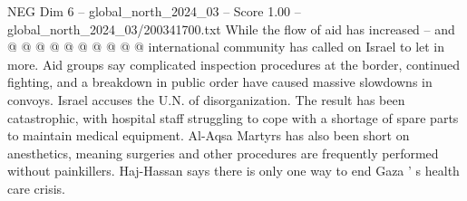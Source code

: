 \begin{textsample}{NEG Dim 6 – global\_north\_2024\_03 – Score 1.00 – global\_north\_2024\_03/200341700.txt}
While the flow of aid has increased -- and @ @ @ @ @ @ @ @ @ @ international community has called on Israel to let in more.
Aid groups say complicated inspection procedures at the border, continued fighting, and a breakdown in public order have caused massive slowdowns in convoys.
Israel accuses the U.N. of disorganization.
The result has been catastrophic, with hospital staff struggling to cope with a shortage of spare parts to maintain medical equipment.
Al-Aqsa Martyrs has also been short on anesthetics, meaning surgeries and other procedures are frequently performed without painkillers.
Haj-Hassan says there is only one way to end Gaza ' s health care crisis.

\end{textsample}
